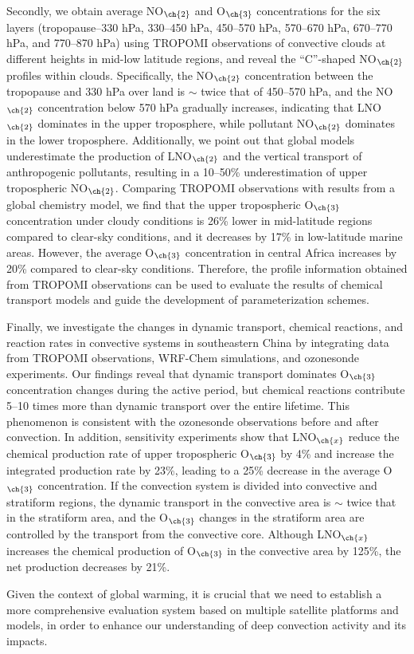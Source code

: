 {Secondly, we obtain average NO$_{\ch{2}}$ and O$_{\ch{3}}$ concentrations for the six layers (tropopause--330 hPa, 330--450 hPa, 450--570 hPa, 570--670 hPa, 670--770 hPa, and 770--870 hPa) using TROPOMI observations of convective clouds at different heights in mid-low latitude regions, and reveal the ``C''-shaped NO$_{\ch{2}}$ profiles within clouds.
Specifically, the NO$_{\ch{2}}$ concentration between the tropopause and 330 hPa over land is $\sim$ twice that of 450--570 hPa, and the NO$_{\ch{2}}$ concentration below 570 hPa gradually increases, indicating that LNO$_{\ch{2}}$ dominates in the upper troposphere, while pollutant NO$_{\ch{2}}$ dominates in the lower troposphere.
Additionally, we point out that global models underestimate the production of LNO$_{\ch{2}}$ and the vertical transport of anthropogenic pollutants, resulting in a 10--50\% underestimation of upper tropospheric NO$_{\ch{2}}$.
Comparing TROPOMI observations with results from a global chemistry model, we find that the upper tropospheric O$_{\ch{3}}$ concentration under cloudy conditions is 26\% lower in mid-latitude regions compared to clear-sky conditions, and it decreases by 17\% in low-latitude marine areas.
However, the average O$_{\ch{3}}$ concentration in central Africa increases by 20\% compared to clear-sky conditions.
Therefore, the profile information obtained from TROPOMI observations can be used to evaluate the results of chemical transport models and guide the development of parameterization schemes.

Finally, we investigate the changes in dynamic transport, chemical reactions, and reaction rates in convective systems in southeastern China by integrating data from TROPOMI observations, WRF-Chem simulations, and ozonesonde experiments.
Our findings reveal that dynamic transport dominates O$_{\ch{3}}$ concentration changes during the active period,
but chemical reactions contribute 5--10 times more than dynamic transport over the entire lifetime.
This phenomenon is consistent with the ozonesonde observations before and after convection.
In addition, sensitivity experiments show that LNO$_{\ch{x}}$ reduce the chemical production rate of upper tropospheric O$_{\ch{3}}$ by 4\% and increase the integrated production rate by 23\%,
leading to a 25\% decrease in the average O$_{\ch{3}}$ concentration.
If the convection system is divided into convective and stratiform regions,
the dynamic transport in the convective area is $\sim$ twice that in the stratiform area,
and the O$_{\ch{3}}$ changes in the stratiform area are controlled by the transport from the convective core.
Although LNO$_{\ch{x}}$ increases the chemical production of O$_{\ch{3}}$ in the convective area by 125\%, the net production decreases by 21\%.

Given the context of global warming,
it is crucial that we need to establish a more comprehensive evaluation system based on multiple satellite platforms and models,
in order to enhance our understanding of deep convection activity and its impacts.
}
